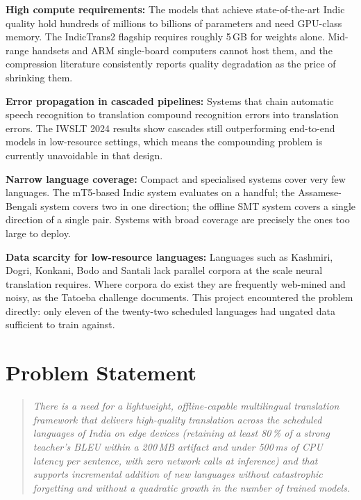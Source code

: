 \textbf{High compute requirements:} The models that achieve state-of-the-art
Indic quality hold hundreds of millions to billions of parameters and need
GPU-class memory. The IndicTrans2 flagship requires roughly 5\,GB for weights
alone. Mid-range handsets and ARM single-board computers cannot host them, and
the compression literature \cite{ref:mobilenmt, ref:small100} consistently reports
quality degradation as the price of shrinking them.

\textbf{Error propagation in cascaded pipelines:} Systems that chain automatic
speech recognition to translation \cite{ref:iwslt} compound recognition errors
into translation errors. The IWSLT 2024 results show cascades still outperforming
end-to-end models in low-resource settings, which means the compounding problem
is currently unavoidable in that design.

\textbf{Narrow language coverage:} Compact and specialised systems cover very few
languages. The mT5-based Indic system \cite{ref:mt5indic} evaluates on a handful;
the Assamese-Bengali system \cite{ref:assamese} covers two in one direction; the
offline SMT system \cite{ref:offlinesmt} covers a single direction of a single
pair. Systems with broad coverage are precisely the ones too large to deploy.

\textbf{Data scarcity for low-resource languages:} Languages such as Kashmiri,
Dogri, Konkani, Bodo and Santali lack parallel corpora at the scale neural
translation requires. Where corpora do exist they are frequently web-mined and
noisy, as the Tatoeba challenge \cite{ref:tatoeba} documents. This project
encountered the problem directly: only eleven of the twenty-two scheduled
languages had ungated data sufficient to train against.

\section{Problem Statement}
\label{sec:problem}

\begin{quote}
\itshape
There is a need for a lightweight, offline-capable multilingual translation
framework that delivers high-quality translation across the scheduled languages
of India on edge devices (retaining at least 80\,\% of a strong teacher's BLEU
within a 200\,MB artifact and under 500\,ms of CPU latency per sentence, with
zero network calls at inference) and that supports incremental addition of new
languages without catastrophic forgetting and without a quadratic growth in the
number of trained models.
\end{quote}


